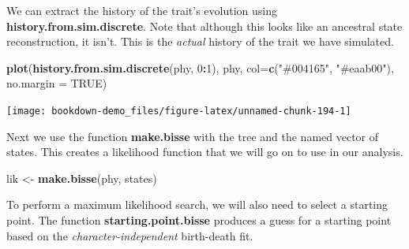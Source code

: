 \documentclass[
]{book}
\newenvironment{Shaded}{\begin{snugshade}}{\end{snugshade}}
\newcommand{\DataTypeTok}[1]{\textcolor[rgb]{0.13,0.29,0.53}{#1}}
\newcommand{\DecValTok}[1]{\textcolor[rgb]{0.00,0.00,0.81}{#1}}
\newcommand{\KeywordTok}[1]{\textcolor[rgb]{0.13,0.29,0.53}{\textbf{#1}}}
\newcommand{\NormalTok}[1]{#1}
\newcommand{\OperatorTok}[1]{\textcolor[rgb]{0.81,0.36,0.00}{\textbf{#1}}}
\newcommand{\OtherTok}[1]{\textcolor[rgb]{0.56,0.35,0.01}{#1}}
\newcommand{\StringTok}[1]{\textcolor[rgb]{0.31,0.60,0.02}{#1}}
\begin{document}
\begin{Shaded}
\end{Shaded}

We can extract the history of the trait's evolution using \textbf{history.from.sim.discrete}. Note that although this looks like an ancestral state reconstruction, it isn't. This is the \emph{actual} history of the trait we have simulated.

\begin{Shaded}
\begin{Highlighting}[]
\KeywordTok{plot}\NormalTok{(}\KeywordTok{history.from.sim.discrete}\NormalTok{(phy, }\DecValTok{0}\OperatorTok{:}\DecValTok{1}\NormalTok{), }
\NormalTok{     phy, }\DataTypeTok{col=}\KeywordTok{c}\NormalTok{(}\StringTok{"\#004165"}\NormalTok{, }\StringTok{"\#eaab00"}\NormalTok{), }\DataTypeTok{no.margin =} \OtherTok{TRUE}\NormalTok{)}
\end{Highlighting}
\end{Shaded}

\begin{center}\texttt{[image: bookdown-demo\_files/figure-latex/unnamed-chunk-194-1]} \end{center}

Next we use the function \textbf{make.bisse} with the tree and the named vector of states. This creates a likelihood function that we will go on to use in our analysis.

\begin{Shaded}
\begin{Highlighting}[]
\NormalTok{lik \textless{}{-}}\StringTok{ }\KeywordTok{make.bisse}\NormalTok{(phy, states)}
\end{Highlighting}
\end{Shaded}

To perform a maximum likelihood search, we will also need to select a starting point. The function \textbf{starting.point.bisse} produces a guess for a starting point based on the \emph{character-independent} birth-death fit.
\end{document}
